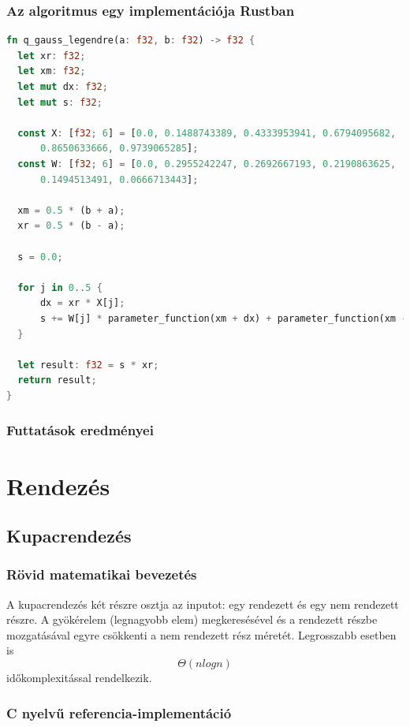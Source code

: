 \subsubsection{Az algoritmus egy implementációja Rustban}
\begin{lstlisting}[language=Rust]
fn q_gauss_legendre(a: f32, b: f32) -> f32 {
  let xr: f32;
  let xm: f32;
  let mut dx: f32;
  let mut s: f32;
  
  const X: [f32; 6] = [0.0, 0.1488743389, 0.4333953941, 0.6794095682,
      0.8650633666, 0.9739065285];
  const W: [f32; 6] = [0.0, 0.2955242247, 0.2692667193, 0.2190863625,
      0.1494513491, 0.0666713443];
  
  xm = 0.5 * (b + a);
  xr = 0.5 * (b - a);
  
  s = 0.0;
  
  for j in 0..5 {
	  dx = xr * X[j];
	  s += W[j] * parameter_function(xm + dx) + parameter_function(xm - dx);
  }
  
  let result: f32 = s * xr;
  return result;
}  
\end{lstlisting}

\subsubsection{Futtatások eredményei}

\section{Rendezés}

\subsection{Kupacrendezés}

\subsubsection{Rövid matematikai bevezetés}

A kupacrendezés két részre osztja az inputot: egy rendezett és egy nem rendezett részre. A gyökérelem (legnagyobb elem) megkeresésével és a rendezett részbe mozgatásával egyre csökkenti a nem rendezett rész méretét. Legrosszabb esetben is \[ \Theta(n log n)\] időkomplexitással rendelkezik.

\subsubsection{C nyelvű referencia-implementáció}

